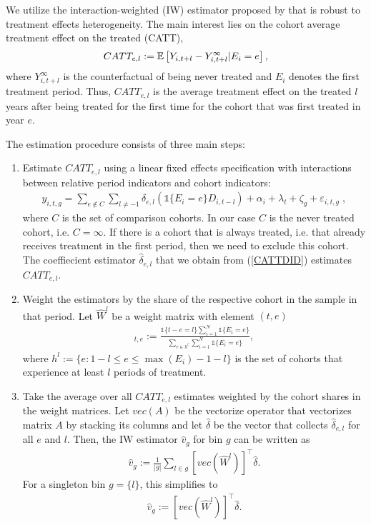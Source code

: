 We utilize the interaction-weighted (IW) estimator proposed by \cite{Sun_2021} that is robust to treatment effects heterogeneity. The main interest lies on the cohort average treatment effect on the treated (CATT),
\begin{align*}
	CATT_{e, l} := \mathbb{E} \left[ Y_{i, t+l} - Y_{i, t+l}^{\infty} | E_i = e \right],
\end{align*}
where $Y_{i, t+l}^{\infty}$ is the counterfactual of being never treated and $E_i$ denotes the first treatment period. Thus, $CATT_{e, l}$ is the average treatment effect on the treated $l$ years after being treated for the first time for the cohort that was first treated in year $e$.

The estimation procedure consists of three main steps:
\begin{enumerate}
	\item Estimate $CATT_{e, l}$ using a linear fixed effects specification with interactions between relative period indicators and cohort indicators:
	\begin{align} \label{CATTDID}
		y_{i, t, g} = \sum_{e \notin C}^{}\sum_{l \neq -1}^{} \delta_{e, l} (\mathds{1}\{E_i = e\} D_{i, t-l}) + \alpha_i + \lambda_t + \zeta_g + \varepsilon_{i, t, g} \;,
	\end{align}
	where $C$ is the set of comparison cohorts. In our case $C$ is the never treated cohort, i.e. $C = {\infty}$. If there is a cohort that is always treated, i.e. that already receives treatment in the first period, then we need to exclude this cohort. The coeffiecient estimator $\widehat{\delta}_{e, l}$ that we obtain from (\ref{CATTDID}) estimates $CATT_{e, l}$.
	
	\item Weight the estimators by the share of the respective cohort in the sample in that period. Let $\hat{W}^l$ be a weight matrix with element $(t, e)$
	\begin{align*}
		[\widehat{W}^l]_{t, e} := \frac{\mathds{1}\{t - e = l\} \sum_{i = 1}^{N} \mathds{1}\{E_i = e\}}{\sum_{e \in h^{l}} \sum_{i = 1}^{N} \mathds{1}\{E_i = e\}},
	\end{align*}
	where $h^{l} := \{e: 1 - l \leq e \leq \max(E_i) - 1 - l\}$ is the set of cohorts that experience at least $l$ periods of treatment.
	
	\item Take the average over all $CATT_{e, l}$ estimates weighted by the cohort shares in the weight matrices. Let $vec(A)$ be the vectorize operator that vectorizes matrix $A$ by stacking its columns and let $\widehat{\delta}$ be the vector that collects $\widehat{\delta}_{e, l}$ for all $e$ and $l$. Then, the IW estimator $\widehat{v}_g$ for bin $g$ can be written as 
	\begin{align}
		\widehat{v}_g := \frac{1}{|g|} \sum_{l \in g} [vec(\widehat{W}^l)]^\intercal \widehat{\delta}.
	\end{align}
	For a singleton bin $g = \{l\}$, this simplifies to
	\begin{align*}
		\widehat{v}_{g} := [vec(\widehat{W}^l)]^\intercal \widehat{\delta}.
	\end{align*}
	
\end{enumerate}

